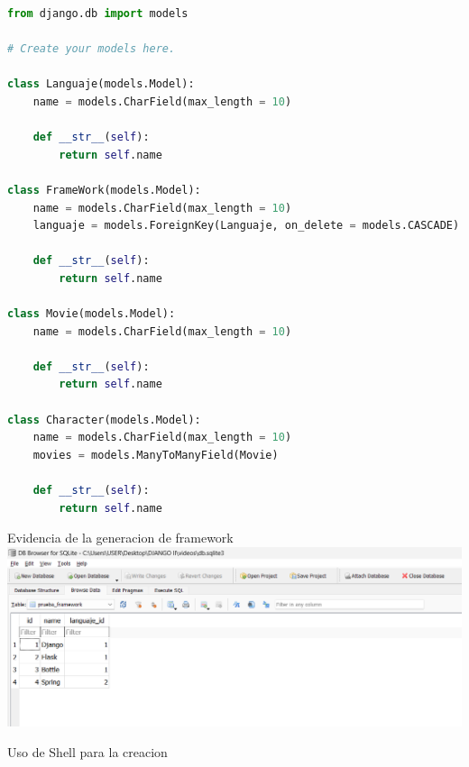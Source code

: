 \documentclass{article}
\begin{document}
        \begin{lstlisting}[language=Python, caption=models.py]
from django.db import models

# Create your models here.

class Languaje(models.Model):
    name = models.CharField(max_length = 10)

    def __str__(self):
        return self.name
        
class FrameWork(models.Model):
    name = models.CharField(max_length = 10)
    languaje = models.ForeignKey(Languaje, on_delete = models.CASCADE)

    def __str__(self):
        return self.name
    
class Movie(models.Model):
    name = models.CharField(max_length = 10)

    def __str__(self):
        return self.name
    
class Character(models.Model):
    name = models.CharField(max_length = 10)
    movies = models.ManyToManyField(Movie)

    def __str__(self):
        return self.name

        \end{lstlisting}
        \item Evidencia de la generacion de framework
        \newline\newline \newline\newline \newline\newline 
        \includegraphics[width=1\textwidth,keepaspectratio]{IMAGENES/Evidencia Primer video I.png}
        \newline \newline\newline 
        \item Uso de Shell para la creacion
        \newline \newline\newline  
\end{document}
